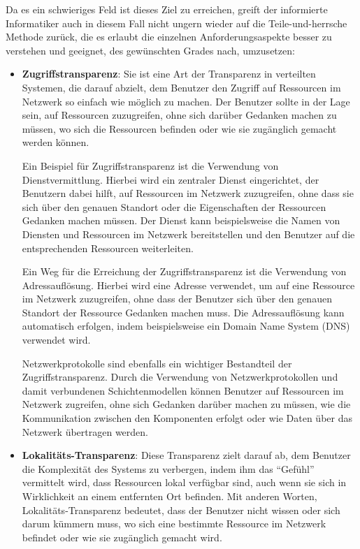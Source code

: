 Da es ein schwieriges Feld ist dieses Ziel zu erreichen, greift der informierte Informatiker auch in diesem Fall nicht ungern wieder auf die Teile-und-herrsche Methode zurück, die es erlaubt die einzelnen Anforderungsaspekte besser zu verstehen und geeignet, des gewünschten Grades nach, umzusetzen:
\begin{itemize}
\item  \textbf{Zugriffstransparenz}: Sie ist eine Art der Transparenz in verteilten Systemen, die darauf abzielt, dem Benutzer den Zugriff auf Ressourcen im Netzwerk so einfach wie möglich zu machen. Der Benutzer sollte in der Lage sein, auf Ressourcen zuzugreifen, ohne sich darüber Gedanken machen zu müssen, wo sich die Ressourcen befinden oder wie sie zugänglich gemacht werden können.

Ein Beispiel für Zugriffstransparenz ist die Verwendung von Dienstvermittlung. Hierbei wird ein zentraler Dienst eingerichtet, der Benutzern dabei hilft, auf Ressourcen im Netzwerk zuzugreifen, ohne dass sie sich über den genauen Standort oder die Eigenschaften der Ressourcen Gedanken machen müssen. Der Dienst kann beispielsweise die Namen von Diensten und Ressourcen im Netzwerk bereitstellen und den Benutzer auf die entsprechenden Ressourcen weiterleiten.

Ein Weg für die Erreichung der Zugriffstransparenz ist die Verwendung von Adressauflösung. Hierbei wird eine Adresse verwendet, um auf eine Ressource im Netzwerk zuzugreifen, ohne dass der Benutzer sich über den genauen Standort der Ressource Gedanken machen muss. Die Adressauflösung kann automatisch erfolgen, indem beispielsweise ein Domain Name System (DNS) verwendet wird.

Netzwerkprotokolle sind ebenfalls ein wichtiger Bestandteil der Zugriffstransparenz. Durch die Verwendung von Netzwerkprotokollen und damit verbundenen Schichtenmodellen können Benutzer auf Ressourcen im Netzwerk zugreifen, ohne sich Gedanken darüber machen zu müssen, wie die Kommunikation zwischen den Komponenten erfolgt oder wie Daten über das Netzwerk übertragen werden.

\item \textbf{Lokalitäts-Transparenz}: Diese Transparenz zielt darauf ab, dem Benutzer die Komplexität des Systems zu verbergen, indem ihm das \enquote{Gefühl} vermittelt wird, dass Ressourcen lokal verfügbar sind, auch wenn sie sich in Wirklichkeit an einem entfernten Ort befinden. Mit anderen Worten, Lokalitäts-Transparenz bedeutet, dass der Benutzer nicht wissen oder sich darum kümmern muss, wo sich eine bestimmte Ressource im Netzwerk befindet oder wie sie zugänglich gemacht wird.


\end{itemize}
